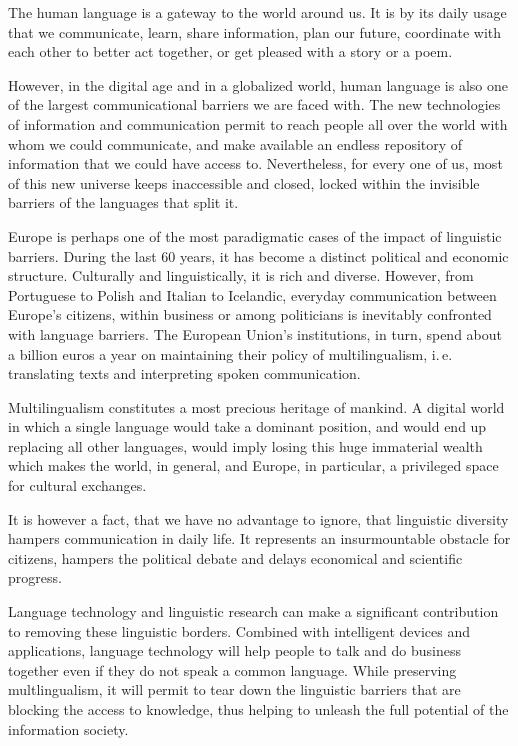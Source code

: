   \begin{multicols}{2}

  The human language is a gateway to the world around us.
  It is by its daily usage that we communicate, learn, share information,
  plan our future, coordinate with each other to better act together,
  or get pleased with a story or a poem.

  However, in the digital age and in a globalized world, human language is also
  one of the largest communicational barriers we are faced with.
  The new technologies of information and communication permit to reach people
  all over the world with whom we could communicate, and make available
  an endless repository of information that we could have access to.
  Nevertheless, for every one of us, most of this new universe
  keeps inaccessible and closed, locked within the invisible
  barriers of the languages that split it.

  Europe is perhaps one of the most paradigmatic cases of the impact
  of linguistic barriers. 
  During the last 60 years, it has become a distinct political and economic structure. 
  Culturally and linguistically, it is rich and diverse. However, from Portuguese to Polish 
  and Italian to Icelandic, everyday communication between Europe’s citizens, within business 
  or among politicians is inevitably confronted with language barriers. 
  The European Union's institutions, in turn, spend about a billion euros a year on 
  maintaining their policy of multilingualism, i.\,e. trans\-la\-ting texts and interpreting spoken communication.

  Multilingualism constitutes a most precious heritage of mankind.
  A digital world in which a single language would take a dominant position, and would end up
  replacing all other languages,
  would imply losing this huge immaterial wealth
  which makes the world, in general, and Europe, in particular, a privileged
  space for cultural exchanges.

  It is however a fact, that we have no advantage to ignore, that linguistic diversity
  hampers communication in daily life. It represents an insurmountable obsta\-cle for citizens,
  hampers the political debate and delays economical and scientific progress.

  Language technology and linguistic research can make a significant contribution to removing these linguistic borders. 
  Combined with intelligent devices and applications, language technology will help people to talk and do business together 
  even if they do not speak a common language. While preserving multlingualism,
  it will permit to tear down the linguistic barriers that are blocking the access to knowledge,
  thus helping to unleash the full potential of the information society.


\end{multicols}
